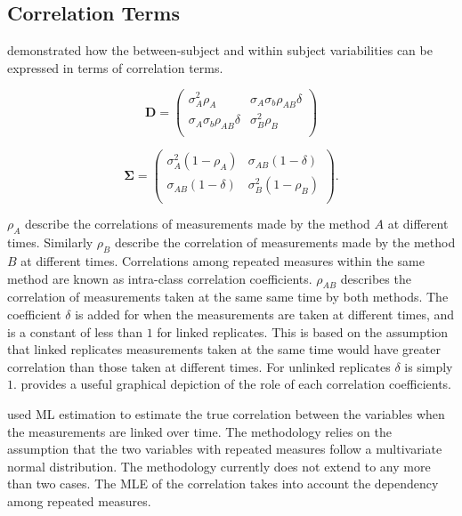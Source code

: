 \documentclass[12pt, a4paper]{report}
\theoremstyle{plain}
\theoremstyle{definition}
\theoremstyle{remark}
\begin{document}

		\subsection{Correlation Terms}

	\citet{hamlett} demonstrated how the between-subject and within subject variabilities can be expressed in terms of
	correlation terms.
	
	\[
	\boldsymbol{D} = \left( \begin{array}{cc}
	\sigma^2_{A}\rho_{A} & \sigma_{A}\sigma_{b}\rho_{AB}\delta \\
	\sigma_{A}\sigma_{b}\rho_{AB}\delta & \sigma^2_{B}\rho_{B}\\
	
	\end{array}\right)
	\]
	
	\[
	\boldsymbol{\Sigma} = \left(
	\begin{array}{cc}
	\sigma^2_{A}(1-\rho_{A}) & \sigma_{AB}(1-\delta)  \\
	\sigma_{AB}(1-\delta) & \sigma^2_{B}(1-\rho_{B}) \\
	\end{array}\right).
	\]
	
	$\rho_{A}$ describe the correlations of measurements made by the method $A$ at different times. Similarly $\rho_{B}$ describe the correlation of measurements made by the method $B$ at different times. Correlations among repeated measures within the same method are known as intra-class correlation coefficients. $\rho_{AB}$ describes the correlation of measurements taken at the same same time by both methods. The coefficient $\delta$ is added for when the measurements are taken at different times, and is a constant of less than $1$ for linked replicates. This is based on the assumption that linked replicates measurements taken at the same time would have greater correlation than those taken at different times. For unlinked replicates $\delta$ is simply $1$. \citet{hamlett} provides a useful graphical depiction of the role of each correlation coefficients.
	
	\citet{lam} used ML estimation to estimate the true correlation between the variables when the measurements are linked over time. The methodology relies on the assumption that the two variables with repeated measures follow a multivariate normal distribution. The methodology currently does not extend to any more than two cases. The MLE of the correlation takes into account the dependency among repeated measures.
	
\end{document}
